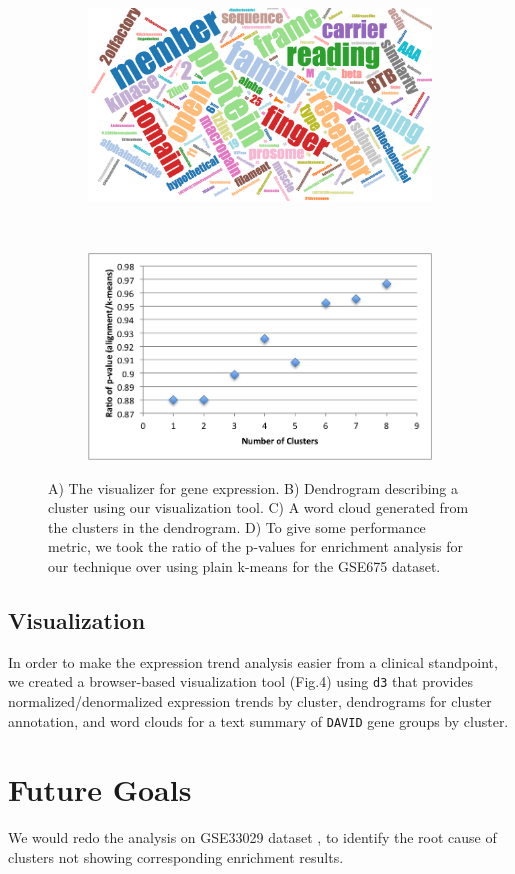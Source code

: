 \documentclass[aps,prd,final,onecolumn,a4paper,10pt]{revtex4}
\begin{document}
\begin{figure}[H]
  \begin{subfigure}[b]{0.5\textwidth}
    \includegraphics[width=.7\textwidth]{wordcloud.png}
    \label{fig:wordcloud}
  \end{subfigure}%
  ~
  \begin{subfigure}[b]{0.5\textwidth}
    \includegraphics[width=.5\textwidth]{pvalue_performace.png}
    \label{fig:pvalue}
  \end{subfigure}%
  \label{fig:enrichment}
  \caption{A) The visualizer for gene expression. B) Dendrogram describing a cluster using our visualization tool. C) A word cloud generated from the clusters in the dendrogram. D) To give some performance metric, we took the ratio of the p-values for enrichment analysis for our technique over using plain k-means for the GSE675 dataset.}
\end{figure}


\subsection{Visualization}

In order to make the expression trend analysis easier from a clinical standpoint, we created a browser-based visualization tool (Fig.4) using \verb!d3! that provides normalized/denormalized expression trends by cluster, dendrograms for cluster annotation, and word clouds for a text summary of \verb!DAVID! gene groups by cluster.

\section{Future Goals}
We would redo the analysis on GSE33029 dataset , to identify the root cause of clusters not showing corresponding enrichment results. 
\end{document}
